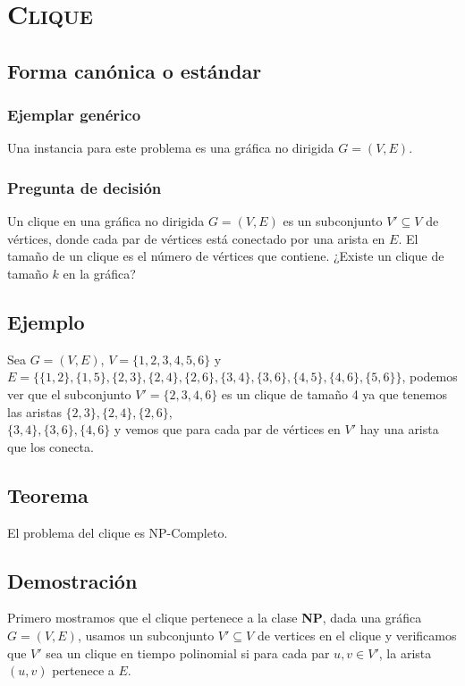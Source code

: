 \documentclass[a4paper]{article}
\begin{document}
\newpage
\section{\textsc{Clique}}
\subsection{Forma canónica o estándar}
\subsubsection{Ejemplar genérico}

Una instancia para este problema es una gráfica no dirigida $G=(V,E)$.

\subsubsection{Pregunta de decisión}

Un clique en una gráfica no dirigida $G=(V,E)$ es un subconjunto $V'\subseteq V$ de vértices, donde cada par de vértices está conectado por una arista en $E$. El tamaño de un clique es el número de vértices que contiene. ¿Existe un clique de tamaño $k$ en la gráfica?

\subsection{Ejemplo}

Sea $G=(V,E)$, $V=\{1,2,3,4,5,6\}$ y $E=\{\{1,2\},\{1,5\},\{2,3\},\{2,4\},\{2,6\},\{3,4\},\{3,6\},\{4,5\},\{4,6\},\{5,6\}\}$, podemos ver que el subconjunto $V'=\{2,3,4,6\}$ es un clique de tamaño 4 ya que tenemos las aristas $\{2,3\},\{2,4\},\{2,6\},$\\
$\{3,4\},\{3,6\},\{4,6\}$ y vemos que para cada par de vértices en $V'$ hay una arista que los conecta.

\subsection{Teorema}

El problema del clique es NP-Completo.

\subsection{Demostración}

Primero mostramos que el clique pertenece a la clase \textbf{NP}, dada una gráfica $G=(V,E)$, usamos un subconjunto $V'\subseteq V$ de vertices en el clique y verificamos que $V'$ sea un clique en tiempo polinomial si para cada par $u,v\in V'$, la arista $(u,v)$ pertenece a $E$.
\end{document}
